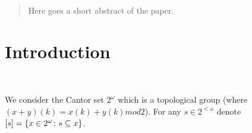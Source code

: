 \author[Short names, if too many authors to fit in the header]{Author's Name$^{\ast}$}
\address{Faculty of Technical Sciences, \newline
Svetog Save 65,  \v{C}a\v{c}ak \newline
Serbia}


\date{}

\begin{abstract}
Here goes a short abstract of the paper.
\end{abstract}

\maketitle



\section{Introduction}




\bigskip
{} \\
\bigskip

We consider the Cantor set $2^\omega$ 
which is a topological group (where 
$(x+y)(k) = x(k) + y(k) \mathit{mod} 2$).
For any $s\in 2^{<\omega}$ denote 
$[s] = \{x\in2^{\omega}\colon s \subseteq x\}$.

